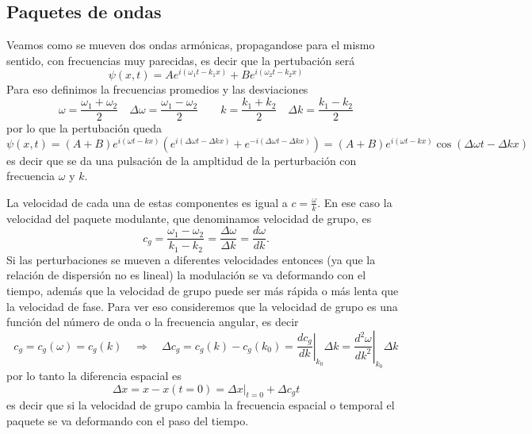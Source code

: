 \documentclass[a4paper,spanish]{article}
\numberwithin{equation}{section}
\begin{document}
\subsection{Paquetes de ondas}
			Veamos como se mueven dos ondas arm\'onicas, propagandose para el mismo sentido, con frecuencias muy parecidas, es decir que la pertubaci\'on ser\'a
			\begin{equation*}
				\psi(x,t) = A e^{i(\omega_1 t - k_1 x)} + B e^{i(\omega_2 t - k_2 x)}
			\end{equation*}
			Para eso definimos la frecuencias promedios y las desviaciones
			\begin{equation}
				\omega = \frac{\omega_1 + \omega_2}{2} \quad \Delta \omega = \frac{\omega_1 - \omega_2}{2} \qquad k = \frac{k_1 + k_2}{2} \quad \Delta k = \frac{k_1 - k_2}{2}
				\label{eq:ondas_paquetes_batidos_frecuencias}
			\end{equation}
			por lo que la pertubaci\'on queda
			\begin{equation}
				\psi(x,t) = (A + B) e^{i (\omega t - k x)} \left(e^{i(\Delta \omega t - \Delta k x)} + e^{-i(\Delta \omega t - \Delta k x)}\right) = (A + B) e^{i(\omega t - k x)} \cos(\Delta \omega t - \Delta k x)
				\label{eq:ondas_paquetes_batidos}
			\end{equation}
			es decir que se da una pulsaci\'on de la ampltidud de la perturbaci\'on con frecuencia $\omega$ y $k$. 
			
			La velocidad de cada una de estas componentes es igual a $c = \frac{\omega}{k}$. En ese caso la velocidad del paquete modulante, que denominamos velocidad de grupo, es
			\begin{equation}
				c_g = \frac{\omega_1 - \omega_2}{k_1 - k_2} = \frac{\Delta \omega}{\Delta k} = \frac{d \omega}{d k}.
				\label{eq:ondas_paquetes_velocidad_grupo}
			\end{equation}
			Si las perturbaciones se mueven a diferentes velocidades entonces (ya que la relaci\'on de dispersi\'on no es lineal) la modulaci\'on se va deformando con el tiempo, adem\'as que la velocidad de grupo puede ser m\'as r\'apida o m\'as lenta que la velocidad de fase. Para ver eso consideremos que la velocidad de grupo es una funci\'on del n\'umero de onda o la frecuencia angular, es decir
			\[ c_g = c_g(\omega) = c_g(k) \quad \Rightarrow \quad \Delta c_g = c_g(k) - c_g(k_0) = \left.\frac{d c_g}{d k}\right|_{k_0} \Delta k = \left.\frac{d^2 \omega}{d k^2}\right|_{k_0}  \Delta k\]
			por lo tanto la diferencia espacial es
			\[ \Delta x = x - x(t=0) = \left.\Delta x\right|_{t = 0} + \Delta c_g t\]
			es decir que si la velocidad de grupo cambia la frecuencia espacial o temporal el paquete se va deformando con el paso del tiempo.
			
\end{document}
